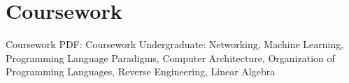 \section
{Coursework}
{Coursework}
{PDF: Coursework}
\BulletItem
Undergraduate: 
Networking, Machine Learning, Programming Language Paradigms, Computer Architecture, Organization of Programming Languages, Reverse Engineering, Linear Algebra 
\hfill